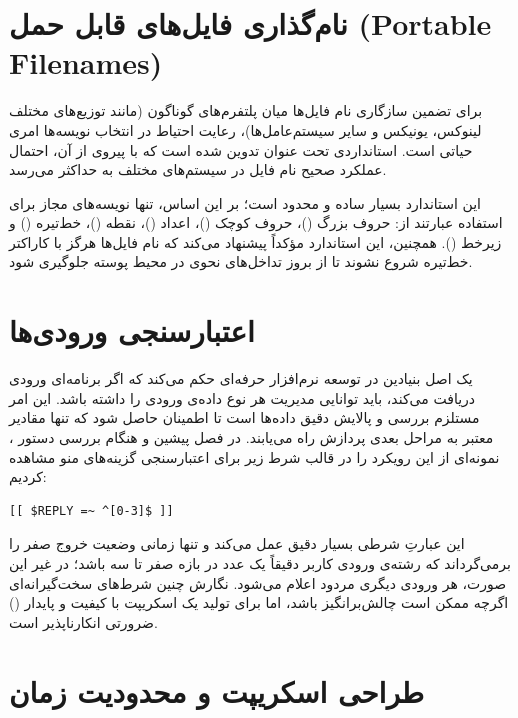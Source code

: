 \section{نام‌گذاری فایل‌های قابل حمل (Portable Filenames)}

برای تضمین سازگاری نام فایل‌ها میان پلتفرم‌های گوناگون (مانند توزیع‌های مختلف لینوکس، یونیکس و سایر سیستم‌عامل‌ها)، رعایت احتیاط در انتخاب نویسه‌ها امری حیاتی است. استانداردی تحت عنوان  تدوین شده است که با پیروی از آن، احتمال عملکرد صحیح نام فایل در سیستم‌های مختلف به حداکثر می‌رسد.

این استاندارد بسیار ساده و محدود است؛ بر این اساس، تنها نویسه‌های مجاز برای استفاده عبارتند از: حروف بزرگ ()، حروف کوچک ()، اعداد ()، نقطه ()، خط‌تیره (\cmd{-}) و زیرخط (\cmd{\_}). همچنین، این استاندارد مؤکداً پیشنهاد می‌کند که نام فایل‌ها هرگز با کاراکتر خط‌تیره شروع نشوند تا از بروز تداخل‌های نحوی در محیط پوسته جلوگیری شود.

\section{اعتبارسنجی ورودی‌ها}

یک اصل بنیادین در توسعه نرم‌افزار حرفه‌ای حکم می‌کند که اگر برنامه‌ای ورودی دریافت می‌کند، باید توانایی مدیریت هر نوع داده‌ی ورودی را داشته باشد. این امر مستلزم بررسی و پالایش دقیق داده‌ها است تا اطمینان حاصل شود که تنها مقادیر معتبر به مراحل بعدی پردازش راه می‌یابند. در فصل پیشین و هنگام بررسی دستور ، نمونه‌ای از این رویکرد را در قالب شرط زیر برای اعتبارسنجی گزینه‌های منو مشاهده کردیم:

\begin{latin}
\begin{lstlisting}
[[ $REPLY =~ ^[0-3]$ ]]
\end{lstlisting}
\end{latin}

این عبارتِ شرطی بسیار دقیق عمل می‌کند و تنها زمانی وضعیت خروج صفر را برمی‌گرداند که رشته‌ی ورودی کاربر دقیقاً یک عدد در بازه صفر تا سه باشد؛ در غیر این صورت، هر ورودی دیگری مردود اعلام می‌شود. نگارش چنین شرط‌های سخت‌گیرانه‌ای اگرچه ممکن است چالش‌برانگیز باشد، اما برای تولید یک اسکریپت با کیفیت و پایدار () ضرورتی انکارناپذیر است.

\section{طراحی اسکریپت و محدودیت زمان}

